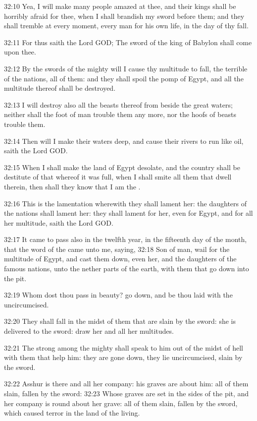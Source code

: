 32:10 Yea, I will make many people amazed at thee, and their kings
shall be horribly afraid for thee, when I shall brandish my sword
before them; and they shall tremble at every moment, every man for his
own life, in the day of thy fall.

32:11 For thus saith the Lord GOD; The sword of the king of Babylon
shall come upon thee.

32:12 By the swords of the mighty will I cause thy multitude to fall,
the terrible of the nations, all of them: and they shall spoil the
pomp of Egypt, and all the multitude thereof shall be destroyed.

32:13 I will destroy also all the beasts thereof from beside the great
waters; neither shall the foot of man trouble them any more, nor the
hoofs of beasts trouble them.

32:14 Then will I make their waters deep, and cause their rivers to
run like oil, saith the Lord GOD.

32:15 When I shall make the land of Egypt desolate, and the country
shall be destitute of that whereof it was full, when I shall smite all
them that dwell therein, then shall they know that I am the \LORD.

32:16 This is the lamentation wherewith they shall lament her: the
daughters of the nations shall lament her: they shall lament for her,
even for Egypt, and for all her multitude, saith the Lord GOD.

32:17 It came to pass also in the twelfth year, in the fifteenth day
of the month, that the word of the \LORD came unto me, saying, 32:18
Son of man, wail for the multitude of Egypt, and cast them down, even
her, and the daughters of the famous nations, unto the nether parts of
the earth, with them that go down into the pit.

32:19 Whom dost thou pass in beauty? go down, and be thou laid with
the uncircumcised.

32:20 They shall fall in the midst of them that are slain by the
sword: she is delivered to the sword: draw her and all her multitudes.

32:21 The strong among the mighty shall speak to him out of the midst
of hell with them that help him: they are gone down, they lie
uncircumcised, slain by the sword.

32:22 Asshur is there and all her company: his graves are about him:
all of them slain, fallen by the sword: 32:23 Whose graves are set in
the sides of the pit, and her company is round about her grave: all of
them slain, fallen by the sword, which caused terror in the land of
the living.

